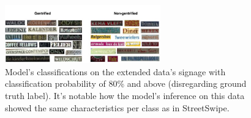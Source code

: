 \begin{figure}[]
        \label{fig:output_vis_SS_incorrect}
    \includegraphics[width=0.6\textwidth]{media/results/output_vis-pano1.jpg}
        \caption{Model's classifications on the extended data's signage with classification probability of 80\% and above (disregarding ground truth label). It's notable how the model's inference on this data showed the same characteristics per class as in StreetSwipe.}
        \label{fig:output_vis_pano}
\end{figure}